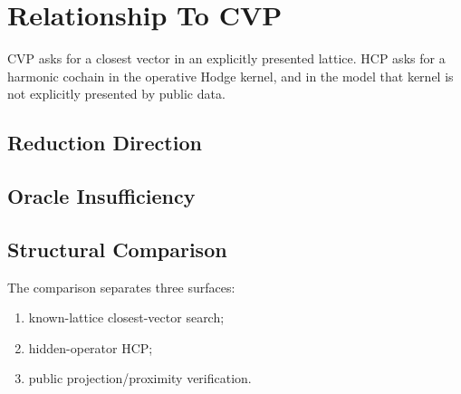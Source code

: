 \section{Relationship To CVP}

CVP asks for a closest vector in an explicitly presented lattice. HCP asks for
a harmonic cochain in the operative Hodge kernel, and in the \HE{} model that
kernel is not explicitly presented by public data.

\subsection{Reduction Direction}


\subsection{Oracle Insufficiency}


\subsection{Structural Comparison}

The comparison separates three surfaces:
\begin{enumerate}[label=(\roman*)]
  \item known-lattice closest-vector search;
  \item hidden-operator HCP;
  \item public projection/proximity verification.
\end{enumerate}
